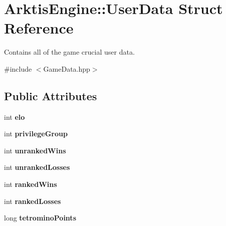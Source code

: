\hypertarget{struct_arktis_engine_1_1_user_data}{}\section{Arktis\+Engine\+::User\+Data Struct Reference}
\label{struct_arktis_engine_1_1_user_data}


Contains all of the game crucial user data.  




{\ttfamily \#include $<$Game\+Data.\+hpp$>$}

\subsection*{Public Attributes}
\begin{DoxyCompactItemize}
\item 
\mbox{\label{struct_arktis_engine_1_1_user_data_a3dfe828d431d22ef4db318aa74a737dd}} 
int {\bfseries elo}
\item 
\mbox{\label{struct_arktis_engine_1_1_user_data_a8d4fc110705b7b09514f5fd47f623d75}} 
int {\bfseries privilege\+Group}
\item 
\mbox{\label{struct_arktis_engine_1_1_user_data_a9d652dc7d273b3b955d196ec9c179dd3}} 
int {\bfseries unranked\+Wins}
\item 
\mbox{\label{struct_arktis_engine_1_1_user_data_ad399b5935fb833761bc07f151eb9970d}} 
int {\bfseries unranked\+Losses}
\item 
\mbox{\label{struct_arktis_engine_1_1_user_data_a7c66ab989ff844ecc4de490600658230}} 
int {\bfseries ranked\+Wins}
\item 
\mbox{\label{struct_arktis_engine_1_1_user_data_a54c50b18a7e77e7fd875bc7f9a377007}} 
int {\bfseries ranked\+Losses}
\item 
\mbox{\label{struct_arktis_engine_1_1_user_data_a1be4a671af64837167a78386ee03bc0b}} 
long {\bfseries tetromino\+Points}
\item 

\end{DoxyCompactItemize}
